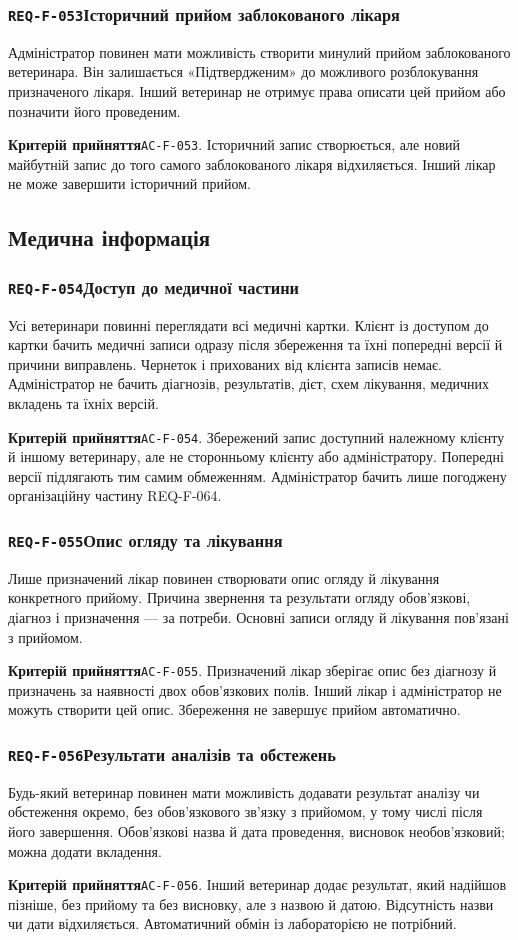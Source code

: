 \documentclass[11pt,a4paper]{article}
\newcommand{\requirement}[4]{%
  \Needspace{7\baselineskip}%
  \subsubsection*{\hypertarget{#1}{\texttt{#1}}\quad #2}%
  #3\par
  \textbf{Критерій прийняття}\quad #4\par\medskip}
\begin{document}
\requirement{REQ-F-053}{Історичний прийом заблокованого лікаря}{Адміністратор повинен мати можливість створити минулий прийом заблокованого ветеринара. Він залишається «Підтвердженим» до можливого розблокування призначеного лікаря. Інший ветеринар не отримує права описати цей прийом або позначити його проведеним.}{\hypertarget{AC-F-053}{\texttt{AC-F-053}}. Історичний запис створюється, але новий майбутній запис до того самого заблокованого лікаря відхиляється. Інший лікар не може завершити історичний прийом.}

\subsection{Медична інформація}
\requirement{REQ-F-054}{Доступ до медичної частини}{Усі ветеринари повинні переглядати всі медичні картки. Клієнт із доступом до картки бачить медичні записи одразу після збереження та їхні попередні версії й причини виправлень. Чернеток і прихованих від клієнта записів немає. Адміністратор не бачить діагнозів, результатів, дієт, схем лікування, медичних вкладень та їхніх версій.}{\hypertarget{AC-F-054}{\texttt{AC-F-054}}. Збережений запис доступний належному клієнту й іншому ветеринару, але не сторонньому клієнту або адміністратору. Попередні версії підлягають тим самим обмеженням. Адміністратор бачить лише погоджену організаційну частину REQ-F-064.}

\requirement{REQ-F-055}{Опис огляду та лікування}{Лише призначений лікар повинен створювати опис огляду й лікування конкретного прийому. Причина звернення та результати огляду обов’язкові, діагноз і призначення — за потреби. Основні записи огляду й лікування пов’язані з прийомом.}{\hypertarget{AC-F-055}{\texttt{AC-F-055}}. Призначений лікар зберігає опис без діагнозу й призначень за наявності двох обов’язкових полів. Інший лікар і адміністратор не можуть створити цей опис. Збереження не завершує прийом автоматично.}

\requirement{REQ-F-056}{Результати аналізів та обстежень}{Будь-який ветеринар повинен мати можливість додавати результат аналізу чи обстеження окремо, без обов’язкового зв’язку з прийомом, у тому числі після його завершення. Обов’язкові назва й дата проведення, висновок необов’язковий; можна додати вкладення.}{\hypertarget{AC-F-056}{\texttt{AC-F-056}}. Інший ветеринар додає результат, який надійшов пізніше, без прийому та без висновку, але з назвою й датою. Відсутність назви чи дати відхиляється. Автоматичний обмін із лабораторією не потрібний.}
\end{document}
